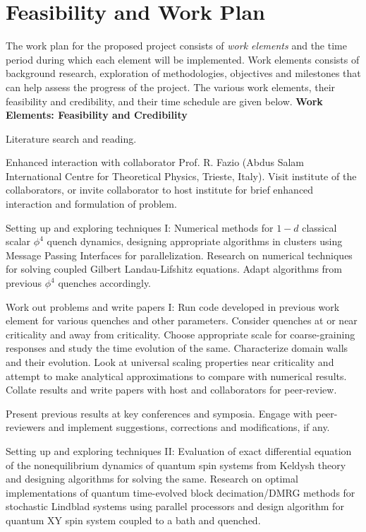 \documentclass[a4paper,11pt,color]{article}
\begin{document}
\section{Feasibility and Work  Plan}
\label{sec:feasibility}
The work plan for the proposed project consists of \textit{work elements} and the time period during which each element will be implemented. Work elements consists of background research, exploration of methodologies, objectives and milestones that can help assess the progress of the project. The various work elements, their feasibility and credibility, and their time schedule are given below.
\textbf{Work Elements: Feasibility and Credibility}
\begin{enumerate}{
\item
Literature search and reading.
\item
Enhanced interaction with collaborator Prof. R. Fazio (Abdus Salam International Centre for Theoretical Physics, Trieste, Italy). Visit institute of the collaborators, or invite collaborator to host institute for brief enhanced interaction and formulation of problem.
\item
Setting up and exploring techniques I: Numerical methods for $1-d$ classical scalar $\phi^4$ quench dynamics, designing appropriate algorithms in clusters using Message Passing Interfaces for parallelization. Research on numerical techniques for solving coupled Gilbert Landau-Lifshitz equations. Adapt algorithms from previous $\phi^4$ quenches  accordingly.
\item
Work out problems and write papers I: Run code developed in previous work element for various quenches and other parameters. Consider quenches at or near criticality and away from criticality. Choose appropriate scale for coarse-graining responses and study the time evolution of the same. Characterize domain walls and their evolution. Look at universal scaling properties near criticality and attempt to make analytical approximations to compare with numerical results. Collate results and write papers with host and collaborators for peer-review.
\item
Present previous results at key conferences and symposia. Engage with peer-reviewers and implement suggestions, corrections and modifications, if any.
\item
Setting up and exploring techniques II: Evaluation of exact differential equation of the nonequilibrium dynamics of quantum spin systems from Keldysh theory and designing algorithms for solving the same. Research on optimal implementations of quantum time-evolved block decimation/DMRG methods for stochastic Lindblad systems using parallel processors and design algorithm for quantum XY spin system coupled to a bath and quenched.
}
\end{enumerate}
\end{document}
